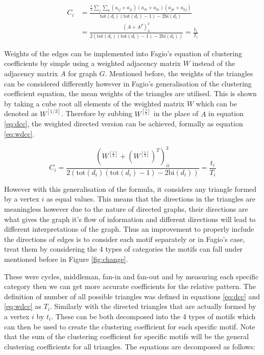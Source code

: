 \begin{align} \label{eq:dcc}
C_i &= \frac{\frac{1}{2}\sum_j \sum_k (a_{ij} + a_{ji})(a_{ik} + a_{ki})(a_{jk} + a_{kj})}{\text{tot}(d_i)(\text{tot}(d_i) - 1) - 2\text{bi}(d_i)} \\
&= \frac{(A + A^T)^3_{ii}}{2(\text{tot}(d_i)(\text{tot}(d_i) - 1) - 2\text{bi}(d_i))} = \frac{t_i}{T_i} \nonumber
\end{align}

Weights of the edges can be implemented into Fagio's equation of clustering coefficients by simple using a weighted adjacency matrix $W$ instead of the adjacency matrix $A$ for graph $G$. Mentioned before, the weights of the triangles can be considered differently however in Fagio's generalisation of the clustering coefficient equation, the mean weights of the triangles are utilised. This is shown by taking a cube root all elements of the weighted matrix $W$ which can be denoted as $W^{[1/3]}$. Therefore by subbing $W^{[\frac{1}{3}]}$ in the place of $A$ in equation \ref{eq:dcc}, the weighted directed version can be achieved, formally as equation \ref{eq:wdcc}.

\begin{equation} \label{eq:wdcc}
C_i = \frac{(W^{[\frac{1}{3}]} + (W^{[\frac{1}{3}]})^T)^3_{ii}}{2(\text{tot}(d_i)(\text{tot}(d_i) - 1) - 2\text{bi}(d_i))} = \frac{t_i}{T_i}
\end{equation}

However with this generalisation of the formula, it considers any triangle formed by a vertex $i$ as equal values. This means that the directions in the triangles are meaningless however due to the nature of directed graphs, their directions are what gives the graph it's flow of information and different directions will lead to different interpretations of the graph. Thus an improvement to properly include the directions of edges is to consider each motif separately or in Fagio's case, treat them by considering the 4 types of categories the motifs can fall under mentioned before in Figure \ref{fig:change}. 

These were cycles, middleman, fan-in and fan-out and by measuring each specific category then we can get more accurate coefficients for the relative pattern. The definition of number of all possible triangles was defined in equations \ref{eq:dcc} and \ref{eq:wdcc} as $T_i$. Similarly with the directed triangles that are actually formed by a vertex $i$ by $t_i$. These can be both decomposed into the 4 types of motifs which can then be used to create the clustering coefficient for each specific motif. Note that the sum of the clustering coefficient for specific motifs will be the general clustering coefficients for all triangles. The equations are decomposed as follows:

